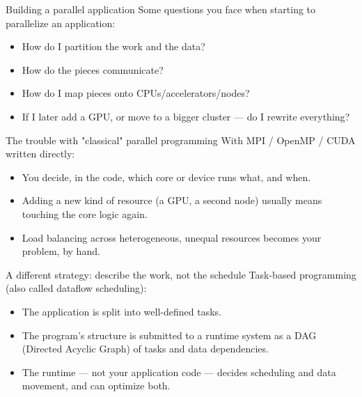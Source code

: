\documentclass[presentation, aspectratio=169]{beamer}
\begin{document}
\begin{frame}[label={sec:org5b185b8}]{Building a parallel application}
Some questions you face when starting to parallelize an application:
\begin{itemize}
\item How do I \alert{partition} the work and the data?
\item How do the pieces \alert{communicate}?
\item How do I \alert{map} pieces onto CPUs/accelerators/nodes?
\item If I later add a GPU, or move to a bigger cluster — do I rewrite
everything?
\end{itemize}
\end{frame}
\begin{frame}[label={sec:orge1a2d36}]{The trouble with "classical" parallel programming}
With MPI / OpenMP / CUDA written directly:
\begin{itemize}
\item \alert{You} decide, in the code, which core or device runs what, and when.
\item Adding a new kind of resource (a GPU, a second node) usually means
touching the core logic again.
\item Load balancing across heterogeneous, unequal resources becomes your
problem, by hand.
\end{itemize}
\end{frame}
\begin{frame}[label={sec:orgbda5c88}]{A different strategy: describe the work, not the schedule}
Task-based programming (also called \alert{dataflow scheduling}):
\begin{itemize}
\item The application is split into well-defined \alert{tasks}.
\item The program's structure is submitted to a \alert{runtime system} as a
\alert{DAG} (Directed Acyclic Graph) of tasks and data dependencies.
\item The \alert{runtime} — not your application code — decides scheduling and
data movement, and can optimize both.
\end{itemize}
\end{frame}
\end{document}
